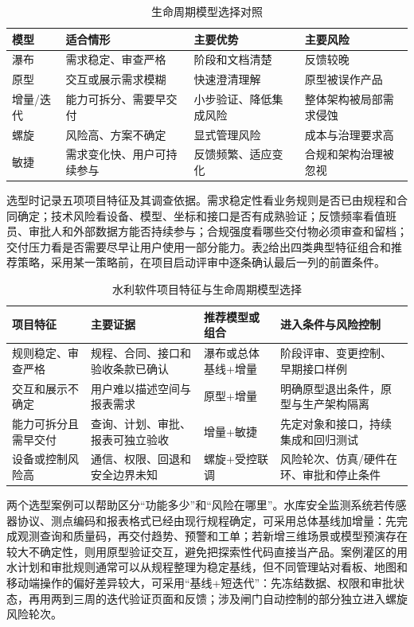 \begin{table}[htbp]
\centering
\caption{生命周期模型选择对照}
\label{tab:lifecycle-comparison}
\begin{tabular}{p{2.0cm}p{3.4cm}p{3.8cm}p{3.4cm}}
\toprule
模型 & 适合情形 & 主要优势 & 主要风险 \\
\midrule
瀑布 & 需求稳定、审查严格 & 阶段和文档清楚 & 反馈较晚 \\
原型 & 交互或展示需求模糊 & 快速澄清理解 & 原型被误作产品 \\
增量/迭代 & 能力可拆分、需要早交付 & 小步验证、降低集成风险 & 整体架构被局部需求侵蚀 \\
螺旋 & 风险高、方案不确定 & 显式管理风险 & 成本与治理要求高 \\
敏捷 & 需求变化快、用户可持续参与 & 反馈频繁、适应变化 & 合规和架构治理被忽视 \\
\bottomrule
\end{tabular}
\end{table}

选型时记录五项项目特征及其调查依据。需求稳定性看业务规则是否已由规程和合同确定；技术风险看设备、模型、坐标和接口是否有成熟验证；反馈频率看值班员、审批人和外部数据方能否持续参与；合规强度看哪些交付物必须审查和留档；交付压力看是否需要尽早让用户使用一部分能力。表\ref{tab:ch02-model-selection}给出四类典型特征组合和推荐策略，采用某一策略前，在项目启动评审中逐条确认最后一列的前置条件。

\begin{table}[htbp]
\centering
\caption{水利软件项目特征与生命周期模型选择}
\label{tab:ch02-model-selection}
\begin{tabular}{p{3.0cm}p{3.8cm}p{3.5cm}p{3.5cm}}
\toprule
项目特征 & 主要证据 & 推荐模型或组合 & 进入条件与风险控制 \\
\midrule
规则稳定、审查严格 & 规程、合同、接口和验收条款已确认 & 瀑布或总体基线+增量 & 阶段评审、变更控制、早期接口样例 \\
交互和展示不确定 & 用户难以描述空间与报表需求 & 原型+增量 & 明确原型退出条件，原型与生产架构隔离 \\
能力可拆分且需早交付 & 查询、计划、审批、报表可独立验收 & 增量+敏捷 & 先定对象和接口，持续集成和回归测试 \\
设备或控制风险高 & 通信、权限、回退和安全边界未知 & 螺旋+受控联调 & 风险轮次、仿真/硬件在环、审批和停止条件 \\
\bottomrule
\end{tabular}
\end{table}

两个选型案例可以帮助区分“功能多少”和“风险在哪里”。水库安全监测系统若传感器协议、测点编码和报表格式已经由现行规程确定，可采用总体基线加增量：先完成观测查询和质量码，再交付趋势、预警和工单；若新增三维场景或模型预演存在较大不确定性，则用原型验证交互，避免把探索性代码直接当产品。案例灌区的用水计划和审批规则通常可以从规程整理为稳定基线，但不同管理站对看板、地图和移动端操作的偏好差异较大，可采用“基线+短迭代”：先冻结数据、权限和审批状态，再用两到三周的迭代验证页面和反馈；涉及闸门自动控制的部分独立进入螺旋风险轮次。

